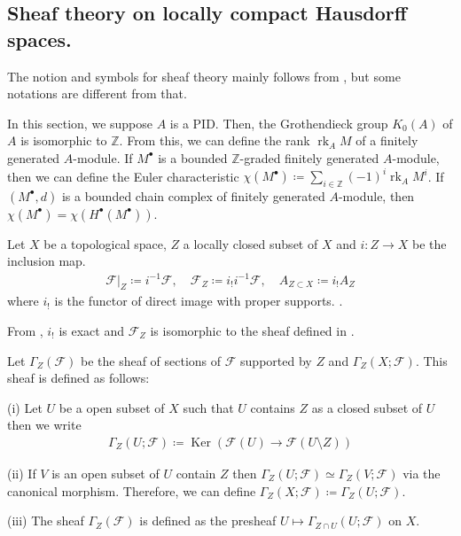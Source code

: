 \documentclass[a4paper,dvipdfmx,reqno,12pt]{amsart}
\theoremstyle{definition}
\newcommand{\deq}{\coloneqq}
\newcommand{\Z}{\mathbb{Z}}%
\newcommand{\mcal}[1]{\mathcal{#1}}%
\newcommand{\opn}[1]{\operatorname{#1}}
\numberwithin{equation}{section}
\begin{document}
\subsection{Sheaf theory on locally compact 
Hausdorff spaces.}
\cite{iversenCohomologySheaves1986a,MR1299726,MR1269324,MR2050072}

The notion and symbols for 
sheaf theory mainly follows from \cite{MR1299726}, 
but some notations are different from that.

In this section, we suppose $A$ is a PID. Then, the Grothendieck 
group $K_0(A)$ of $A$ is isomorphic to $\Z$. From this, 
we can define the rank $\opn{rk}_A M$ of 
a finitely generated $A$-module.
If $M^{\bullet}$ is a bounded $\Z$-graded finitely generated $A$-module,
then we can define the Euler characteristic 
$\chi(M^{\bullet})\deq \sum_{i\in \Z}(-1)^{i}\opn{rk}_A M^{i}$.
If $(M^{\bullet},d)$ is a bounded chain complex of finitely 
generated $A$-module, then 
$\chi(M^{\bullet})=\chi(H^{\bullet}(M^{\bullet}))$.

Let $X$ be a topological space, $Z$ a locally closed 
subset of $X$
and $i\colon Z\to X$ be the inclusion map.
\begin{align}
\mcal{F}|_{Z}\deq i^{-1}\mcal{F}, \quad 
\mcal{F}_Z\deq i_! i^{-1}\mcal{F}, \quad 
A_{Z\subset X}\deq i_! A_Z
\end{align}
where $i_!$ is the functor of 
direct image with proper supports. \cite[(2.5.1)]{MR1299726}.

From \cite[Proposition 2.5.4]{MR1299726}, $i_!$ is exact 
and $\mcal{F}_Z$ is isomorphic to the sheaf defined in
\cite[p.93]{MR1299726}.

Let $\Gamma_{Z}(\mcal{F})$ be the sheaf of sections of 
$\mcal{F}$ supported by $Z$
\cite[Definition 2.3.8]{MR1299726} and 
$\Gamma_{Z}(X;\mcal{F})$. This sheaf is defined as follows:

(i) Let $U$ be a open subset of $X$ such that $U$ contains
$Z$ as a closed subset of $U$ then we write
\begin{align}
  \Gamma_Z(U;\mcal{F})\deq \opn{Ker}(\mcal{F}(U) \to 
\mcal{F}(U\setminus Z))
\end{align}

(ii) If $V$ is an open subset of $U$ contain $Z$ then
$\Gamma_{Z}(U;\mcal{F})\simeq \Gamma_{Z}(V;\mcal{F})$
via the canonical morphism. Therefore, we can define
$\Gamma_{Z}(X;\mcal{F})\deq \Gamma_{Z}(U;\mcal{F})$.

(iii) The sheaf $\Gamma_{Z}(\mcal{F})$ is defined as the presheaf 
$U\mapsto \Gamma_{Z\cap U}(U;\mcal{F})$ on $X$.
\end{document}
